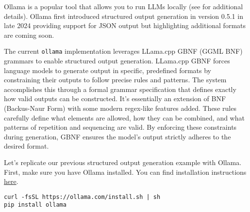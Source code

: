 Ollama \cite{ollama2024website} is a popular tool that allows you to run LLMs locally (see \label{chapter:local} for additional details). Ollama first introduced structured output generation in version 0.5.1 in late 2024 providing support for JSON output but highlighting additional formats are coming soon.

The current \texttt{ollama} implementation leverages LLama.cpp GBNF (GGML BNF) grammars  to enable structured output generation. LLama.cpp GBNF forces language models to generate output in specific, predefined formats by constraining their outputs to follow precise rules and patterns. The system accomplishes this through a formal grammar specification that defines exactly how valid outputs can be constructed. It's essentially an extension of BNF (Backus-Naur Form)  with some modern regex-like features added. These rules carefully define what elements are allowed, how they can be combined, and what patterns of repetition and sequencing are valid. By enforcing these constraints during generation, GBNF ensures the model's output strictly adheres to the desired format.

Let's replicate our previous structured output generation example with Ollama. First, make sure you have Ollama installed. You can find installation instructions \href{https://ollama.com/docs/installation}{here}.

\begin{verbatim}
curl -fsSL https://ollama.com/install.sh | sh
pip install ollama
\end{verbatim}

